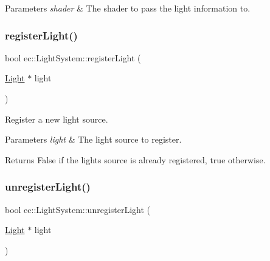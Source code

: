 \begin{DoxyParams}{Parameters}
{\em shader} & The shader to pass the light information to. \\
\hline
\end{DoxyParams}
\mbox{\label{classec_1_1_light_system_a5df705359d32cee10426c23a3ae95fad}} 
\subsubsection{\texorpdfstring{register\+Light()}{registerLight()}}
{\footnotesize\ttfamily bool ec\+::\+Light\+System\+::register\+Light (\begin{DoxyParamCaption}\item[{\mbox{\hyperlink{classec_1_1_light}{Light}} $\ast$}]{light }\end{DoxyParamCaption})}



Register a new light source. 


\begin{DoxyParams}{Parameters}
{\em light} & The light source to register. \\
\hline
\end{DoxyParams}
\begin{DoxyReturn}{Returns}
False if the lights source is already registered, true otherwise. 
\end{DoxyReturn}
\mbox{\label{classec_1_1_light_system_ab1bd930134d6305a5666a165fc41d0f5}} 
\subsubsection{\texorpdfstring{unregister\+Light()}{unregisterLight()}}
{\footnotesize\ttfamily bool ec\+::\+Light\+System\+::unregister\+Light (\begin{DoxyParamCaption}\item[{\mbox{\hyperlink{classec_1_1_light}{Light}} $\ast$}]{light }\end{DoxyParamCaption})}



